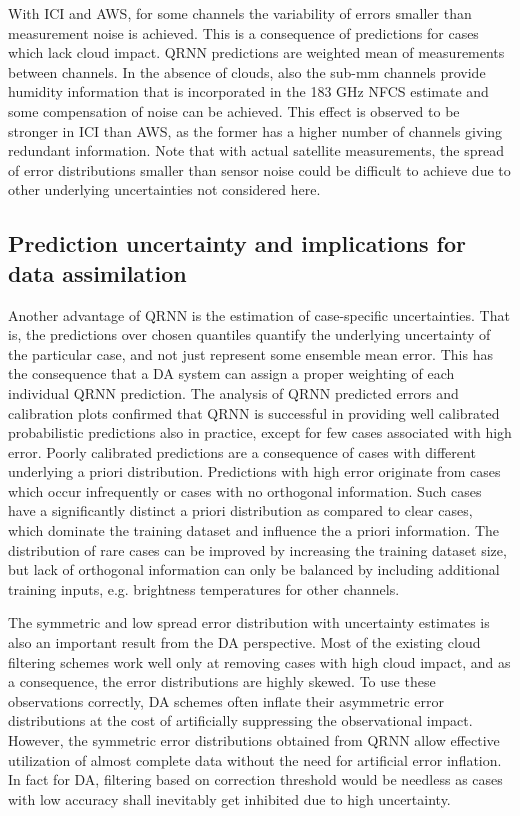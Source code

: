 \documentclass[amt, manuscript]{copernicus}
\begin{document}
With ICI and AWS, for some channels the variability of errors smaller than measurement noise is achieved. This is a consequence of predictions for cases which lack cloud impact. QRNN predictions are weighted mean of measurements between channels. In the absence of clouds, also the sub-mm channels provide humidity information that is incorporated in the 183 GHz NFCS estimate and some compensation of noise can be achieved. This effect is observed to be stronger in ICI than AWS, as the former has a higher number of channels giving redundant information. Note that with actual satellite measurements, the spread of error distributions smaller than sensor noise could be difficult to achieve due to other underlying uncertainties not considered here. 
 


\subsection{Prediction uncertainty and implications for data assimilation}

Another advantage of QRNN is the estimation of case-specific uncertainties. That is, the predictions over chosen quantiles quantify the underlying uncertainty of the particular case, and not just represent some ensemble mean error. This has the consequence that a DA system can assign a proper weighting of each individual QRNN prediction.
The analysis of QRNN predicted errors and calibration plots confirmed that QRNN is successful in providing
well calibrated probabilistic predictions also in practice, except for few cases associated with high error. Poorly calibrated predictions are a consequence of cases with different underlying a priori distribution. Predictions with high error originate from cases which occur infrequently or cases with no orthogonal information. Such cases have a significantly distinct a priori distribution as compared to clear cases, which dominate the training dataset and influence the a priori information. The distribution of rare cases can be improved by increasing the training dataset size, but lack of orthogonal information can only be balanced by including additional training inputs, e.g. brightness temperatures for other channels. 

The symmetric and low spread error distribution with uncertainty estimates is also an important result from the DA perspective. Most of the existing cloud filtering schemes work well only at removing cases with high cloud impact, and as a consequence, the error distributions are highly skewed. To use these observations correctly, DA schemes often inflate their asymmetric error distributions at the cost of artificially suppressing the observational impact. However, the symmetric error distributions obtained from QRNN allow effective utilization of almost complete data without the need for artificial error inflation. In fact for DA, filtering based on correction threshold would be needless as cases with low accuracy shall inevitably get inhibited due to high uncertainty.   
\end{document}
